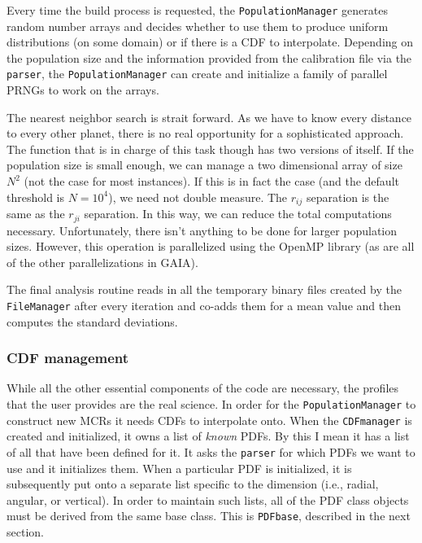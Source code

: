 \documentclass[10pt,a4paper,final]{article}
\numberwithin{equation}{section}
\begin{document}
\begin{multicols}{2}[]
				Every time the build process is requested, the \texttt{PopulationManager}
				generates random number arrays and decides whether to use them to produce
				uniform distributions (on some domain) or if there is a CDF to interpolate.
				Depending on the population size and the information provided from the
				calibration file via the \texttt{parser}, the \texttt{PopulationManager}
				can create and initialize a family of parallel PRNGs to work on
				the arrays.

				The nearest neighbor search is strait forward. As we have to know every
				distance to every other planet, there is no real opportunity for a 
				sophisticated approach. The function that is in charge of this task though
				has two versions of itself. If the population size is small enough, we
				can manage a two dimensional array of size $N^2$ (not the case for most
				instances). If this is in fact the case (and the default threshold is
				$N = 10^4$), we need not double measure. The $r_{ij}$ separation is the
				same as the $r_{ji}$ separation. In this way, we can reduce the total
				computations necessary. Unfortunately, there isn't anything to be done
				for larger population sizes. However, this operation is parallelized 
				using the OpenMP library (as are all of the other parallelizations in GAIA).

				The final analysis routine reads in all the temporary binary files created
				by the \texttt{FileManager} after every iteration and co-adds them for
				a mean value and then computes the standard deviations.


			\subsubsection{CDF management}
				
				While all the other essential components of the code are necessary, the profiles
				that the user provides are the real science. In order for the \texttt{PopulationManager}
				to construct new MCRs it needs CDFs to interpolate onto. When the 
				\texttt{CDFmanager} is created and initialized, it owns a list of \textit{known}
				PDFs. By this I mean it has a list of all that have been defined for it. It asks
				the \texttt{parser} for which PDFs we want to use and it initializes them.
				When a particular PDF is initialized, it is subsequently put onto a separate list specific
				to the dimension (i.e., radial, angular, or vertical). In order to maintain such lists,
				all of the PDF class objects must be derived from the same base class. This is
				\texttt{PDFbase}, described in the next section.


\end{multicols}
\end{document}

